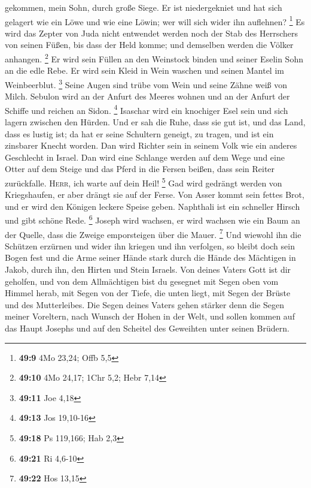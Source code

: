 gekommen, mein Sohn, durch große Siege. Er ist niedergekniet und hat
sich gelagert wie ein Löwe und wie eine Löwin; wer will sich wider ihn
auflehnen? \footnote{\textbf{49:9} 4Mo 23,24; Offb 5,5} 
Es wird das Zepter von Juda nicht entwendet werden noch der Stab des
Herrschers von seinen Füßen, bis dass der Held komme; und demselben
werden die Völker anhangen. \footnote{\textbf{49:10} 4Mo 24,17; 1Chr
  5,2; Hebr 7,14}  Er wird sein Füllen an den Weinstock
binden und seiner Eselin Sohn an die edle Rebe. Er wird sein Kleid in
Wein waschen und seinen Mantel im Weinbeerblut. \footnote{\textbf{49:11}
  Joe 4,18}  Seine Augen sind trübe vom Wein und seine
Zähne weiß von Milch.  Sebulon wird an der Anfurt des
Meeres wohnen und an der Anfurt der Schiffe und reichen an Sidon.
\footnote{\textbf{49:13} Jos 19,10-16}  Isaschar wird ein
knochiger Esel sein und sich lagern zwischen den Hürden. 
Und er sah die Ruhe, dass sie gut ist, und das Land, dass es lustig ist;
da hat er seine Schultern geneigt, zu tragen, und ist ein zinsbarer
Knecht worden.  Dan wird Richter sein in seinem Volk wie
ein anderes Geschlecht in Israel.  Dan wird eine Schlange
werden auf dem Wege und eine Otter auf dem Steige und das Pferd in die
Fersen beißen, dass sein Reiter zurückfalle. 
\textsc{Herr}, ich warte auf dein Heil! \footnote{\textbf{49:18} Ps
  119,166; Hab 2,3}  Gad wird gedrängt werden von
Kriegshaufen, er aber drängt sie auf der Ferse.  Von
Asser kommt sein fettes Brot, und er wird den Königen leckere Speise
geben.  Naphthali ist ein schneller Hirsch und gibt
schöne Rede. \footnote{\textbf{49:21} Ri 4,6-10}  Joseph
wird wachsen, er wird wachsen wie ein Baum an der Quelle, dass die
Zweige emporsteigen über die Mauer. \footnote{\textbf{49:22} Hos 13,15}
 Und wiewohl ihn die Schützen erzürnen und wider ihn
kriegen und ihn verfolgen,  so bleibt doch sein Bogen
fest und die Arme seiner Hände stark durch die Hände des Mächtigen in
Jakob, durch ihn, den Hirten und Stein Israels.  Von
deines Vaters Gott ist dir geholfen, und von dem Allmächtigen bist du
gesegnet mit Segen oben vom Himmel herab, mit Segen von der Tiefe, die
unten liegt, mit Segen der Brüste und des Mutterleibes. 
Die Segen deines Vaters gehen stärker denn die Segen meiner Voreltern,
nach Wunsch der Hohen in der Welt, und sollen kommen auf das Haupt
Josephs und auf den Scheitel des Geweihten unter seinen Brüdern.

